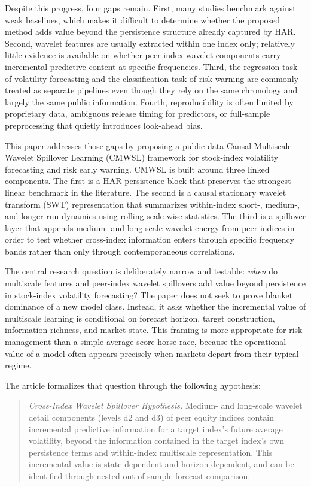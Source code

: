 Despite this progress, four gaps remain. First, many studies benchmark against weak baselines, which makes it difficult to determine whether the proposed method adds value beyond the persistence structure already captured by HAR. Second, wavelet features are usually extracted within one index only; relatively little evidence is available on whether peer-index wavelet components carry incremental predictive content at specific frequencies. Third, the regression task of volatility forecasting and the classification task of risk warning are commonly treated as separate pipelines even though they rely on the same chronology and largely the same public information. Fourth, reproducibility is often limited by proprietary data, ambiguous release timing for predictors, or full-sample preprocessing that quietly introduces look-ahead bias.

This paper addresses those gaps by proposing a public-data Causal Multiscale Wavelet Spillover Learning (CMWSL) framework for stock-index volatility forecasting and risk early warning. CMWSL is built around three linked components. The first is a HAR persistence block that preserves the strongest linear benchmark in the literature. The second is a causal stationary wavelet transform (SWT) representation that summarizes within-index short-, medium-, and longer-run dynamics using rolling scale-wise statistics. The third is a spillover layer that appends medium- and long-scale wavelet energy from peer indices in order to test whether cross-index information enters through specific frequency bands rather than only through contemporaneous correlations.

The central research question is deliberately narrow and testable: \emph{when} do multiscale features and peer-index wavelet spillovers add value beyond persistence in stock-index volatility forecasting? The paper does not seek to prove blanket dominance of a new model class. Instead, it asks whether the incremental value of multiscale learning is conditional on forecast horizon, target construction, information richness, and market state. This framing is more appropriate for risk management than a simple average-score horse race, because the operational value of a model often appears precisely when markets depart from their typical regime.

The article formalizes that question through the following hypothesis:

\begin{quote}
\textit{Cross-Index Wavelet Spillover Hypothesis.} Medium- and long-scale wavelet detail components (levels d2 and d3) of peer equity indices contain incremental predictive information for a target index's future average volatility, beyond the information contained in the target index's own persistence terms and within-index multiscale representation. This incremental value is state-dependent and horizon-dependent, and can be identified through nested out-of-sample forecast comparison.
\end{quote}


